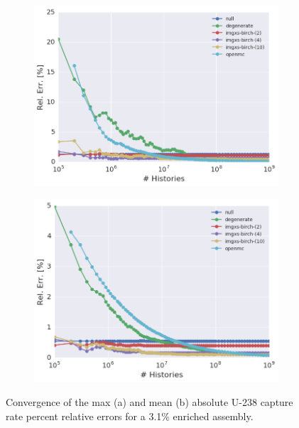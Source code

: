 \begin{figure}[h!]
\centering
\begin{subfigure}{\textwidth}
  \centering
  \includegraphics[width=0.9\linewidth]{figures/results/convergence/assm-31/max-capt-err-evo}
  \caption{}
  \label{fig:chap11-assm-3.1-capture-converge-max}
\end{subfigure}
\begin{subfigure}{\textwidth}
  \centering
  \includegraphics[width=0.9\linewidth]{figures/results/convergence/assm-31/mean-capt-err-evo}
  \caption{}
  \label{fig:chap11-assm-3.1-capture-converge-mean}
\end{subfigure}
\vspace{2mm}
\caption[Fission rate covergence for a 3.1\% enriched assembly]{Convergence of the max (a) and mean (b) absolute U-238 capture rate percent relative errors for a 3.1\% enriched assembly.}
\label{fig:chap11-assm-3.1-capture-converge}
\end{figure}

